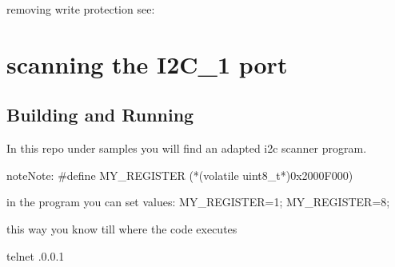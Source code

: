 \documentclass[letterpaper,10pt,english]{sphinxmanual}
\begin{document}
removing write protection see:   {\hyperref[\detokenize{hacking/writeprotection:flashing}]{}}


\section{scanning the I2C\_1 port}
\label{\detokenize{hacking/i2cscanning:scanning-the-i2c-1-port}}\label{\detokenize{hacking/i2cscanning:i2cscanning}}\label{\detokenize{hacking/i2cscanning::doc}}
\begin{sphinxVerbatim}[commandchars=\\\{\}]
       
       
              
        
\end{sphinxVerbatim}


\subsection{Building and Running}
\label{\detokenize{hacking/i2cscanning:building-and-running}}
In this repo under samples you will find an adapted i2c scanner program.

\begin{sphinxVerbatim}[commandchars=\\\{\}]
\end{sphinxVerbatim}

\begin{sphinxadmonition}{note}{Note:}
\#define MY\_REGISTER (*(volatile uint8\_t*)0x2000F000)

in the program you can set values:
MY\_REGISTER=1;
MY\_REGISTER=8;

this way you know till where the code executes
\end{sphinxadmonition}

\begin{sphinxVerbatim}[commandchars=\\\{\}]
telnet .0.0.1 
\end{sphinxVerbatim}
\end{document}
